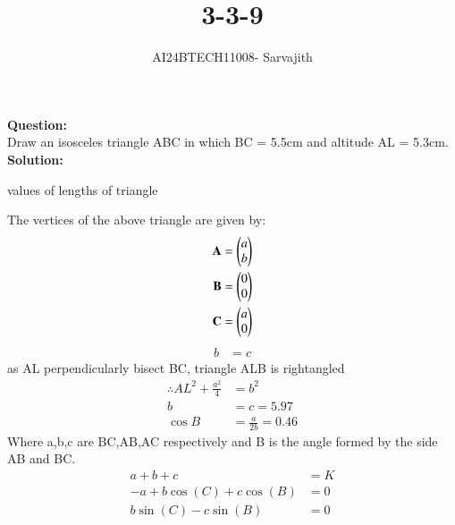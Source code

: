 \documentclass[journal]{IEEEtran}
\begin{document}

\vspace{3cm}

\title{3-3-9}
\author{AI24BTECH11008- Sarvajith
}
{\let\newpage\relax\maketitle}

\renewcommand{\thefigure}{\theenumi}
\renewcommand{\thetable}{\theenumi}
\setlength{\intextsep}{10pt} %
\renewcommand{\thetable}{\theenumi}
\textbf{Question: }\\
Draw an isosceles triangle ABC in which BC = 5.5cm and altitude AL = 5.3cm. \\
\textbf{Solution: }\\
\renewcommand{\tablename}{TABLE 1}
\begin{table}[h!]    
\centering
 
\caption{values of lengths of triangle}
 \label{tab1-1.2-18-1}
\end{table}
The vertices of the above triangle are given by:
\begin{align}
    \textbf{A} &= \begin{pmatrix}a\\b\end{pmatrix} \label{eq. 3-3-9.1}\\
    \textbf{B} &= \begin{pmatrix}0\\0\end{pmatrix}\label{eq. 3-3-9.2}\\
    \textbf{C} &= \begin{pmatrix}a\\0\end{pmatrix}\label{eq. 3-3-9.3}
\end{align}
\begin{align}
b &= c
\end{align}
as AL perpendicularly bisect BC, triangle ALB is rightangled \\
\begin{align}
\therefore AL^2 + \frac{a^2}{4} &= b^2\\
b&=c=5.97\\
\cos B &= \frac{a}{2b} = 0.46
\end{align}
Where a,b,c are BC,AB,AC respectively and B is the angle formed by the side AB and BC.\\
\begin{align*}
	a+b+c&=K\\
	-a+b\cos(C)+c\cos(B)&=0\\
	b\sin(C)-c\sin(B)&=0\\
\end{align*}
\end{document}
